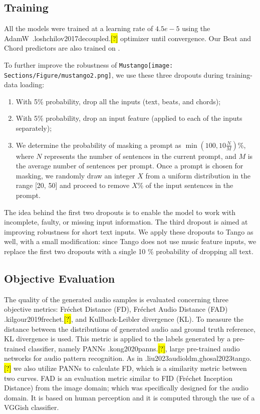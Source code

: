 \documentclass[11pt]{article}
\let\realcite\cite
\renewcommand{\cite}[1]{\ifx.#1.\hl{[?]}\else\realcite{#1}\fi}
\newcommand{\model}{\texttt{Mustango}}
\newcommand{\modelemoji}{\model{}\texttt{[image: Sections/Figure/mustango2.png]}}
\begin{document}
\subsection{Training}
\label{sec:trainsetup}
All the models were trained at a learning rate of $4.5e-5$ using the AdamW~\cite{loshchilov2017decoupled} optimizer until convergence.
Our Beat and Chord predictors are also trained on \dataset{}.

To further improve the robustness of \modelemoji{}, we use these three dropouts during training-data loading:
\begin{enumerate}[itemsep=0pt, leftmargin=*, wide, labelwidth=0pt, labelindent=0pt, parsep=0pt]
    \item With 5\% probability, drop all the inputs (text, beats, and chords);
    \item With 5\% probability, drop an input feature (applied to each of the inputs separately);
    \item We determine the probability of masking a prompt as $\min(100, 10 \frac{N}{M})$\%, where $N$ represents the number of sentences in the current prompt, and $M$ is the average number of sentences per prompt. Once a prompt is chosen for masking, we randomly draw an integer $X$ from a uniform distribution in the range [20, 50] and proceed to remove $X$\% of the input sentences in the prompt.
\end{enumerate}


The idea behind the first two dropouts is to enable the model to work with incomplete, faulty, or missing input information. The third dropout is aimed at improving robustness for short text inputs. We apply these dropouts to Tango as well, with a small modification: since Tango does not use music feature inputs, we replace the first two dropouts with a single 10 \% probability of dropping all text.







\subsection{Objective Evaluation}
\label{sec:objeval}
The quality of the generated audio samples is evaluated concerning three objective metrics: Fréchet Distance (FD), Fréchet Audio Distance (FAD) \cite{kilgour2019frechet}, and Kullback-Leibler divergence (KL).
To measure the distance between the distributions of generated audio and ground truth reference, KL divergence is used. This metric is applied to the labels generated by a pre-trained classifier, namely PANNs \cite{kong2020panns}, large pre-trained audio networks for audio pattern recognition. As in \cite{liu2023audioldm,ghosal2023tango} we also utilize PANNs to calculate FD, which is a similarity metric between two curves.
FAD is an evaluation metric similar to FID (Fréchet Inception Distance) from the image domain; which was specifically designed for the audio domain. It is based on human perception and it is computed through the use of a VGGish classifier.
\end{document}
